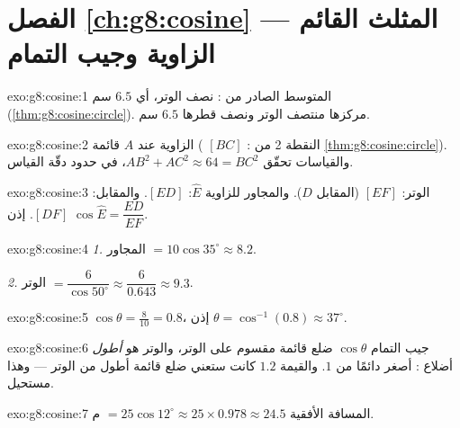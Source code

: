 \section*{الفصل \ref{ch:g8:cosine} --- المثلث القائم الزاوية وجيب التمام}

\begin{solution}{exo:g8:cosine:1}
المتوسط الصادر من : نصف الوتر، أي $6.5$ سم
(\cref{thm:g8:cosine:circle}).  مركزها
منتصف الوتر ونصف قطرها $6.5$ سم.
\end{solution}

\begin{solution}{exo:g8:cosine:2}
الزاوية عند $A$ قائمة ( $[BC]$ : النقطة 2 من
\cref{thm:g8:cosine:circle}). والقياسات تحقّق
$AB^2 + AC^2 \approx 64 = BC^2$، في حدود دقّة القياس.
\end{solution}

\begin{solution}{exo:g8:cosine:3}
الوتر: $[EF]$ (المقابل  $D$). والمجاور
للزاوية $\widehat E$: $[ED]$. والمقابل: $[DF]$. إذن
$\cos\widehat E = \dfrac{ED}{EF}$.
\end{solution}

\begin{solution}{exo:g8:cosine:4}
\emph{1.} المجاور $= 10 \cos 35^\circ \approx 8.2$.

\emph{2.} الوتر $= \dfrac{6}{\cos 50^\circ} \approx
\dfrac{6}{0.643} \approx 9.3$.
\end{solution}

\begin{solution}{exo:g8:cosine:5}
$\cos\theta = \frac{8}{10} = 0.8$، إذن
$\theta = \cos^{-1}(0.8) \approx 37^\circ$.
\end{solution}

\begin{solution}{exo:g8:cosine:6}
جيب التمام $\cos\theta$ ضلع قائمة مقسوم على الوتر، والوتر
هو \emph{أطول} أضلاع : 
أصغر دائمًا من $1$. والقيمة $1.2$ كانت ستعني ضلع قائمة أطول
من الوتر --- وهذا مستحيل.
\end{solution}

\begin{solution}{exo:g8:cosine:7}
المسافة الأفقية $= 25 \cos 12^\circ \approx 25 \times 0.978 \approx
24.5$ م.
\end{solution}

